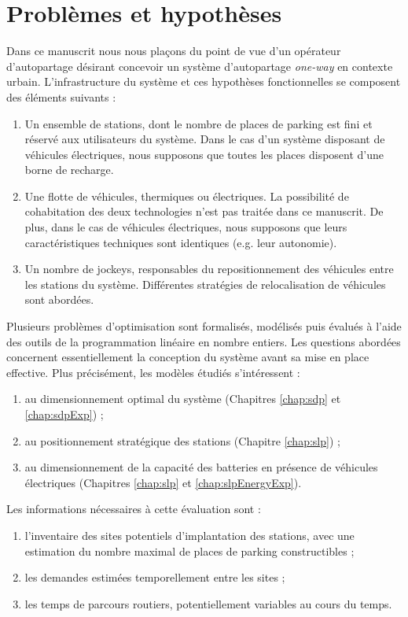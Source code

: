 \section*{Problèmes et hypothèses}

Dans ce manuscrit nous nous plaçons du point de vue d'un opérateur d'autopartage désirant concevoir un système d'autopartage \emph{one-way} en contexte urbain.
L’infrastructure du système et ces hypothèses fonctionnelles se composent des éléments suivants :
\begin{enumerate}
\item
Un ensemble de stations, dont le nombre de places de parking est fini et réservé aux utilisateurs du système.
Dans le cas d’un système disposant de véhicules électriques, nous supposons que toutes les places disposent d’une borne de recharge.
\item
Une flotte de véhicules, thermiques ou électriques.
La possibilité de cohabitation des deux technologies n’est pas traitée dans ce manuscrit.
De plus, dans le cas de véhicules électriques, nous supposons que leurs caractéristiques techniques sont identiques (e.g. leur autonomie).
\item
Un nombre de jockeys, responsables du repositionnement des véhicules entre les stations du système.
Différentes stratégies de relocalisation de véhicules sont abordées.
\end{enumerate}

\medskip
Plusieurs problèmes d'optimisation sont formalisés, modélisés puis évalués à l'aide des outils de la programmation linéaire en nombre entiers.
Les questions abordées concernent essentiellement la conception du système avant sa mise en place effective.
Plus précisément, les modèles étudiés s'intéressent :
\begin{enumerate}
\item au dimensionnement optimal du système (Chapitres \ref{chap:sdp} et \ref{chap:sdpExp}) ;
\item au positionnement stratégique des stations (Chapitre \ref{chap:slp}) ;
\item au dimensionnement de la capacité des batteries en présence de véhicules électriques (Chapitres \ref{chap:slp} et \ref{chap:slpEnergyExp}).
\end{enumerate}


\noindent Les informations nécessaires à cette évaluation sont : 
\begin{enumerate}
\item 
l’inventaire des sites potentiels d’implantation des stations, avec une estimation du nombre maximal de places de parking constructibles ;
\item
les demandes estimées temporellement entre les sites ;
\item 
les temps de parcours routiers, potentiellement variables au cours du temps.
\end{enumerate}


